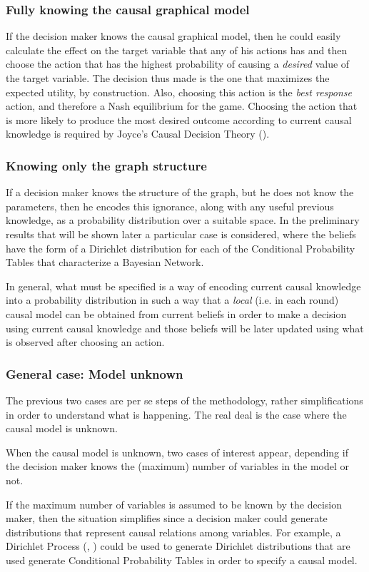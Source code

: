 \documentclass[english,letterpaper,12pt,final]{article}
\theoremstyle{definition}
\begin{document}
\subsubsection{Fully knowing the causal graphical model}
If the decision maker knows the causal graphical model, then he could easily calculate the effect on the target variable that any of his actions has and then choose the action that has the highest probability of causing a \textit{desired} value of the target variable. The decision thus made is the one that maximizes the expected utility, by construction. Also, choosing this action is the \textit{best response} action, and therefore a Nash equilibrium for the game. Choosing the action that is more likely to produce the most desired outcome according to current causal knowledge is required by Joyce's Causal Decision Theory (\cite{joyce1999foundations}).
\subsubsection{Knowing only the graph structure}
If a decision maker knows the structure of the graph, but he does not know the parameters, then he encodes this ignorance, along with any useful previous knowledge, as a probability distribution over a suitable space. In the preliminary results that will be shown later a particular case is considered, where the beliefs have the form of a Dirichlet distribution for each of the Conditional Probability Tables that characterize a Bayesian Network.

In general, what must be specified is a way of encoding current causal knowledge into a probability distribution in such a way that a \textit{local} (i.e. in each round) causal model can be obtained from current beliefs in order to make a decision using current causal knowledge and those beliefs will be later updated using what is observed after choosing an action.  
\subsubsection{General case: Model unknown}
The previous two cases are per se steps of the methodology, rather simplifications in order to understand what is happening. The real deal is the case where the causal model is unknown. 

When the causal model is unknown, two cases of interest appear, depending if the decision maker knows the (maximum) number of variables in the model or not. 

If the maximum number of variables is assumed to be known by the decision maker, then the situation simplifies since a decision maker could generate distributions that represent causal relations among variables. For example, a Dirichlet Process (\cite{ferguson1973bayesian}, \cite{ghosal2017fundamentals}) could be used to generate Dirichlet distributions that are used generate Conditional Probability Tables in order to specify a causal model.
\end{document}
